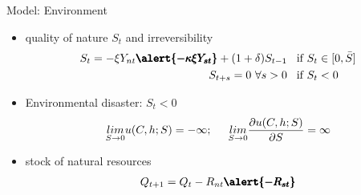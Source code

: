 \documentclass[11pt,aspectratio=169]{beamer}
\begin{document}
\begin{frame}{Model: Environment}
\begin{itemize}
\item quality of nature $S_t$ and irreversibility
\begin{align*}
S_{t}= -\xi Y_{nt}\pmb{\alert{-\kappa \xi Y_{st}}}+(1+\delta)S_{t-1} & \hspace{3mm} \text{if}\  S_{t}\in[0,\bar{S}]\\
S_{t+s}=0 \ \forall s>0& \hspace{3mm}  \text{if} \ S_{t}<0
\end{align*}
\item Environmental disaster: $S_t<0$
\begin{align*}
\underset{S\rightarrow0}{lim} u(C,h;S)=-\infty; 
\hspace{5mm} 
\underset{S\rightarrow0}{lim}\frac{\partial u(C,h;S)}{\partial S}=\infty
\end{align*}
\item stock of natural resources
\begin{align*}
Q_{t+1}=Q_t-R_{nt}\pmb{\alert{-R_{st}}}
\end{align*}
\end{itemize}
\end{frame}

\end{document}
